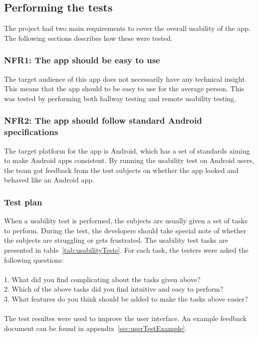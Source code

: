 \subsection{Performing the tests}
The project had two main requirements to cover the overall usability of the app. The following sections describes how these were tested.

\subsubsection{NFR1: The app should be easy to use}
The target audience of this app does not necessarily have any technical insight. This means that the app should to be easy to use for the average person. This was tested by performing both hallway testing and remote usability testing.

\subsubsection{NFR2: The app should follow standard Android specifications}
The target platform for the app is Android, which has a set of standards aiming to make Android apps consistent. By running the usability test on Android users, the team got feedback from the test subjects on whether the app looked and behaved like an Android app.

\subsubsection{Test plan}
When a usability test is performed, the subjects are usually given a set of tasks to perform. During the test, the developers should take special note of whether the subjects are struggling or gets frustrated. The usability test tasks are presented in table~\ref{tab:usabilityTests}. For each task, the testers were asked the following questions:\\\\
1. What did you find complicating about the tasks given above?\\
2. Which of the above tasks did you find intuitive and easy to perform?\\
3. What features do you think should be added to make the tasks above easier?\\\\
The test resultes were used to improve the user interface. An example feedback document can be found in appendix~\ref{sec:userTestExample}.

